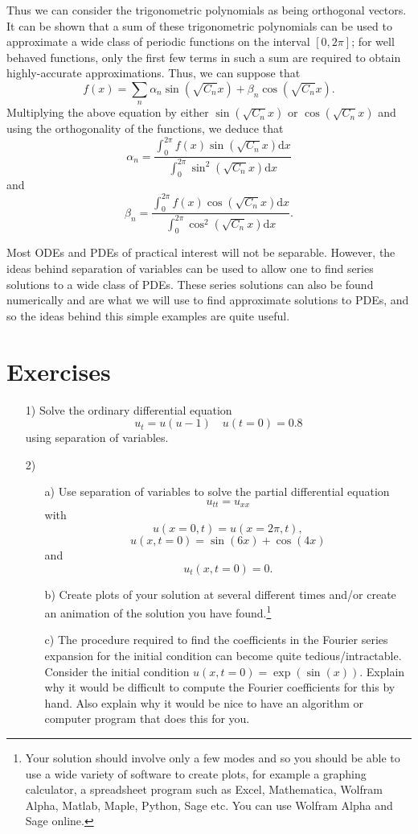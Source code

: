 Thus we can consider the trigonometric polynomials as being orthogonal vectors. It can be shown that a sum of these trigonometric polynomials can be used to approximate a wide class of periodic functions on the interval $[0,2\pi]$; for well behaved functions, only the first few terms in such a sum are required to obtain highly-accurate approximations. Thus, we can suppose that
\begin{equation}
f(x)=\sum_n  \alpha_n\sin(\sqrt{C_n}x) + \beta_n\cos(\sqrt{C_n}x).
\end{equation}
Multiplying the above equation by either $\sin(\sqrt{C_n}x)$ or $\cos(\sqrt{C_n}x)$ and using the orthogonality of the functions, we deduce that
\begin{equation}
\alpha_n=\frac{\int_0^{2\pi}f(x)\sin(\sqrt{C_n}x)\mathrm{d}x}{\int_0^{2\pi}\sin^2(\sqrt{C_n}x)\mathrm{d}x}
\end{equation}
and
\begin{equation}
\beta_n=\frac{\int_0^{2\pi}f(x)\cos(\sqrt{C_n}x)\mathrm{d}x}{\int_0^{2\pi}\cos^2(\sqrt{C_n}x)\mathrm{d}x}.
\end{equation}

Most ODEs and PDEs of practical interest will not be separable. However, the ideas behind separation of variables can be used to allow one to find series solutions to a wide class of PDEs. These series solutions can also be found numerically and are what we will use to find approximate solutions to PDEs, and so the ideas behind this simple examples are quite useful.

\section{Exercises}
\begin{enumerate}
\item[1)] Solve the ordinary differential equation
$$u_t=u(u-1)\quad u(t=0)=0.8$$
using separation of variables.
\item[2)] 
\begin{enumerate}
\item[a)] Use separation of variables to solve the partial differential equation 
$$u_{tt}=u_{xx}$$
with
$$u(x=0,t)=u(x=2\pi,t),$$
$$u(x,t=0)=\sin(6x)+\cos(4x)$$
and
$$u_t(x,t=0)=0.$$
\item[b)] Create plots of your solution at several different times and/or create an animation of the solution you have found.\footnote{Your solution should involve only a few modes and so you should be able to use a wide variety of software to create plots, for example a graphing calculator, a spreadsheet program such as Excel, Mathematica, Wolfram Alpha, Matlab, Maple, Python, Sage etc. You can use Wolfram Alpha and Sage online.} 
\item[c)]  The procedure required to find the coefficients in the Fourier series expansion for the initial condition can become quite tedious/intractable. Consider the initial condition $u(x,t=0)=\exp(\sin(x))$. Explain why it would be difficult to compute the Fourier coefficients for this by hand. Also explain why it would be nice to have an algorithm or computer program that does this for you.
\end{enumerate}
\end{enumerate}
